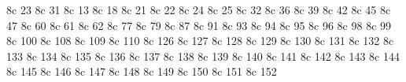\characterdef \capitalcompwordmark   8c  23
\characterdef \ascendercompwordmark  8c  31
\characterdef \quotestraightbase     8c  13
\characterdef \quotestraightdblbase  8c  18
\characterdef \twelveudash           8c  21
\characterdef \threequartersemdash   8c  22
\characterdef \textleftarrow         8c  24
\characterdef \textrightarrow        8c  25
\characterdef \blank                 8c  32
\characterdef \dollar                8c  36
\characterdef \quotesingle           8c  39
\characterdef \asteriskcentered      8c  42
\characterdef \dblhyphen             8c  45
\characterdef \fractionsolidus       8c  47
\characterdef \textlangle            8c  60
\characterdef \textminus             8c  61
\characterdef \textrangle            8c  62
\characterdef \mho                   8c  77
\characterdef \bigcircle             8c  79
\characterdef \ohm                   8c  87
\characterdef \lbrackdbl             8c  91
\characterdef \rbrackdbl             8c  93
\characterdef \textuparrow           8c  94
\characterdef \textdownarrow         8c  95
\characterdef \asciigrave            8c  96
\characterdef \born                  8c  98
\characterdef \divorced              8c  99
\characterdef \died                  8c  100
\characterdef \leaf                  8c  108
\characterdef \married               8c  109
\characterdef \musicalnote           8c  110
\characterdef \tildelow              8c  126
\characterdef \dblhyphenchar         8c  127
\characterdef \asciibreve            8c  128
\characterdef \asciicaron            8c  129
\characterdef \acutedbl              8c  130
\characterdef \gravedbl              8c  131
\let\dag=\relax \let\ddag=\relax
\characterdef \dag                   8c  132
\characterdef \ddag                  8c  133
\characterdef \bardbl                8c  134
\characterdef \perthousand           8c  135
\characterdef \textbullet            8c  136
\characterdef \celsius               8c  137
\characterdef \dollaroldstyle        8c  138
\characterdef \centoldstyle          8c  139
\characterdef \florin                8c  140
\characterdef \colonmonetary         8c  141
\characterdef \won                   8c  142
\characterdef \naira                 8c  143
\characterdef \guarani               8c  144
\characterdef \peso                  8c  145
\characterdef \lira                  8c  146
\characterdef \recipe                8c  147
\characterdef \interrobang           8c  148
\characterdef \interrobangdown       8c  149
\characterdef \dong                  8c  150
\characterdef \trademark             8c  151
\characterdef \pertenthousand        8c  152
